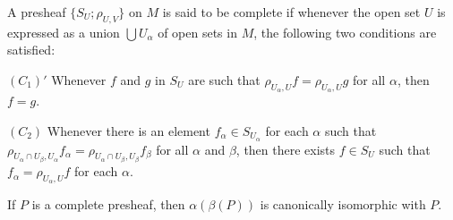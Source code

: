 \begin{definition}\label{thm:5.7}
A presheaf $\{S_{U};\rho_{U,V}\}$ on $M$ is said to be complete if whenever the open set $U$ is expressed as a union $\bigcup U_{\alpha}$ of open sets in $M$, the following two conditions are satisfied:

$(C_{1})'$ Whenever $f$ and $g$ in $S_{U}$ are such that $\rho_{U_{\alpha},U}f = \rho_{U_{\alpha},U}g$ for all $\alpha$, then $f = g$.

$(C_{2})$ Whenever there is an element $f_{\alpha}\in S_{U_{\alpha}}$ for each $\alpha$ such that $\rho_{U_{\alpha}\cap U_{\beta},U_{\alpha}}f_{\alpha}=\rho_{U_{\alpha}\cap U_{\beta},U_{\beta}}f_{\beta}$ for all $\alpha$ and $\beta$, then there exists $f\in S_{U}$ such that $f_{\alpha}=\rho_{U_{\alpha},U}f$ for each $\alpha$.

\end{definition}

\begin{proposition}\label{thm:5.8}
If $P$ is a complete presheaf, then $\alpha(\beta(P))$ is canonically isomorphic with $P$.

\end{proposition}


